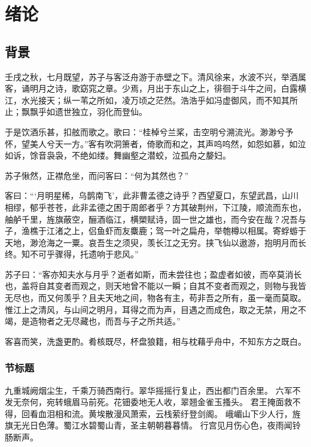 \cleardoublepage

\section{绪论}

\subsection{背景}
壬戌之秋，七月既望，苏子与客泛舟游于赤壁之下。清风徐来，水波不兴，举酒属客，诵明月之诗，歌窈窕之章。少焉，月出于东山之上，徘徊于斗牛之间，白露横江，水光接天；纵一苇之所如，凌万顷之茫然。浩浩乎如冯虚御风，而不知其所止；飘飘乎如遗世独立，羽化而登仙。

于是饮酒乐甚，扣舷而歌之。歌曰：“桂棹兮兰桨，击空明兮溯流光。渺渺兮予怀，望美人兮天一方。”客有吹洞箫者，倚歌而和之，其声呜呜然，如怨如慕，如泣如诉，馀音袅袅，不绝如缕。舞幽壑之潜蛟，泣孤舟之嫠妇。

苏子愀然，正襟危坐，而问客曰：“何为其然也？”

客曰：“‘月明星稀，乌鹊南飞’，此非曹孟德之诗乎？西望夏口，东望武昌，山川相缪，郁乎苍苍，此非孟德之困于周郎者乎？方其破荆州，下江陵，顺流而东也，舳舻千里，旌旗蔽空，酾酒临江，横槊赋诗，固一世之雄也，而今安在哉？况吾与子，渔樵于江渚之上，侣鱼虾而友麋鹿；驾一叶之扁舟，举匏樽以相属。寄蜉蝣于天地，渺沧海之一粟。哀吾生之须臾，羡长江之无穷。挟飞仙以遨游，抱明月而长终。知不可乎骤得，托遗响于悲风。”

苏子曰：“客亦知夫水与月乎？逝者如斯，而未尝往也；盈虚者如彼，而卒莫消长也，盖将自其变者而观之，则天地曾不能以一瞬；自其不变者而观之，则物与我皆无尽也，而又何羡乎？且夫天地之间，物各有主，苟非吾之所有，虽一毫而莫取。惟江上之清风，与山间之明月，耳得之而为声，目遇之而成色，取之无禁，用之不竭，是造物者之无尽藏也，而吾与子之所共适。”

客喜而笑，洗盏更酌。肴核既尽，杯盘狼籍，相与枕藉乎舟中，不知东方之既白。

\subsubsection{节标题}
九重城阙烟尘生，千乘万骑西南行。翠华摇摇行复止，西出都门百余里。
六军不发无奈何，宛转蛾眉马前死。花钿委地无人收，翠翘金雀玉搔头。
君王掩面救不得，回看血泪相和流。黄埃散漫风萧索，云栈萦纡登剑阁。
峨嵋山下少人行，旌旗无光日色薄。蜀江水碧蜀山青，圣主朝朝暮暮情。
行宫见月伤心色，夜雨闻铃肠断声。 


